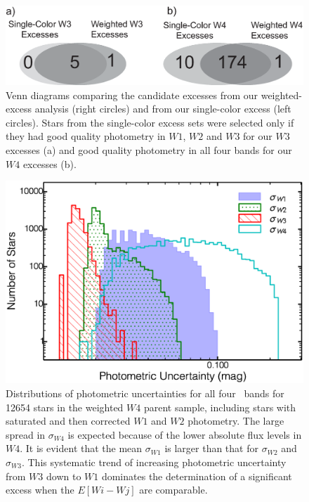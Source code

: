 \begin{figure}
\centering
\includegraphics[scale=0.5]{Ch4/Venn_wtdvsSingle}
\caption[Venn Diagram of \WS\ weighted- and single-color Excesses.]{Venn diagrams comparing the candidate excesses from our weighted-excess analysis (right circles) and from our single-color excess (left circles). Stars from the single-color excess sets were selected only if they had good quality photometry in $W1$, $W2$ and $W3$ for our $W3$ excesses (a) and good quality photometry in all four bands for our $W4$ excesses (b).}
\label{fig:Venn}
\end{figure}


\begin{figure}
\centering
\includegraphics[width=\textwidth]{Ch4/uncdist_psample}
\caption{Distributions of photometric uncertainties for all four \WS\ bands for 12654 stars in the weighted $W4$ parent sample, including stars with saturated and then corrected $W1$ and $W2$ photometry. The large spread in $\sigma_{W4}$ is expected because of the lower absolute flux levels in $W4$. It is evident that the mean $\sigma_{W1}$ is larger than that for $\sigma_{W2}$ and $\sigma_{W3}$. This systematic trend of increasing photometric uncertainty from $W3$ down to $W1$ dominates the determination of a significant excess when the $E[Wi-Wj]$ are comparable.}
\label{fig:wise_errors}
\end{figure}


